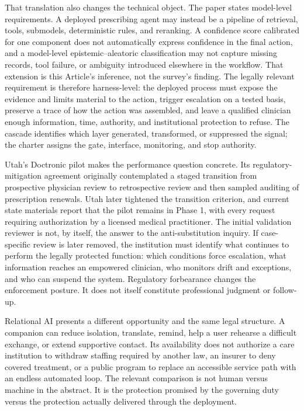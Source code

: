 That translation also changes the technical object. The paper states model-level requirements. A deployed prescribing agent may instead be a pipeline of retrieval, tools, submodels, deterministic rules, and reranking. A confidence score calibrated for one component does not automatically express confidence in the final action, and a model-level epistemic--aleatoric classification may not capture missing records, tool failure, or ambiguity introduced elsewhere in the workflow. That extension is this Article's inference, not the survey's finding. The legally relevant requirement is therefore harness-level: the deployed process must expose the evidence and limits material to the action, trigger escalation on a tested basis, preserve a trace of how the action was assembled, and leave a qualified clinician enough information, time, authority, and institutional protection to refuse. The cascade identifies which layer generated, transformed, or suppressed the signal; the charter assigns the gate, interface, monitoring, and stop authority.

Utah's Doctronic pilot makes the performance question concrete. Its regulatory-mitigation agreement originally contemplated a staged transition from prospective physician review to retrospective review and then sampled auditing of prescription renewals. Utah later tightened the transition criterion, and current state materials report that the pilot remains in Phase 1, with every request requiring authorization by a licensed medical practitioner. The initial validation reviewer is not, by itself, the answer to the anti-substitution inquiry. If case-specific review is later removed, the institution must identify what continues to perform the legally protected function: which conditions force escalation, what information reaches an empowered clinician, who monitors drift and exceptions, and who can suspend the system. Regulatory forbearance changes the enforcement posture. It does not itself constitute professional judgment or follow-up.

Relational AI presents a different opportunity and the same legal structure. A companion can reduce isolation, translate, remind, help a user rehearse a difficult exchange, or extend supportive contact. Its availability does not authorize a care institution to withdraw staffing required by another law, an insurer to deny covered treatment, or a public program to replace an accessible service path with an endless automated loop. The relevant comparison is not human versus machine in the abstract. It is the protection promised by the governing duty versus the protection actually delivered through the deployment.

